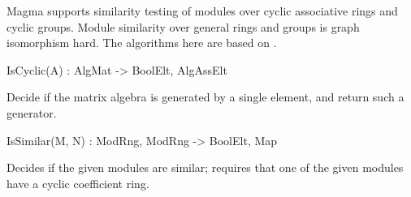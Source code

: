 

Magma supports similarity testing of modules over cyclic associative rings and cyclic groups.
Module similarity over general rings and groups is graph isomorphism hard.  The algorithms
here are based on \cite{BW:Module-iso}.

\begin{intrinsics}
IsCyclic(A) : AlgMat -> BoolElt, AlgAssElt
\end{intrinsics}

Decide if the matrix algebra is generated by a single element, and return such a generator.

\begin{intrinsics}
IsSimilar(M, N) : ModRng, ModRng -> BoolElt, Map
\end{intrinsics}

Decides if the given modules are similar; requires that one of the given modules have a cyclic coefficient ring.

